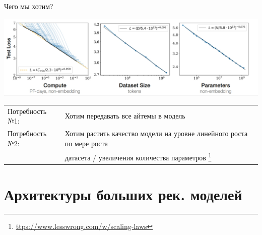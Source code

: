 \documentclass[11pt,aspectratio=169,handout]{beamer}
\begin{document}
\begin{frame}{Чего мы хотим?}
\begin{center}
\includegraphics[scale=0.25]{images/scaling_laws.png}
\end{center}

\vfill
\begin{small}
\begin{tabular}{l l}
Потребность №1: & Хотим передавать все айтемы в модель \\
Потребность №2: & Хотим растить качество модели на уровне линейного роста по мере роста \\
& датасета / увеличения количества параметров
\footnote{\url{ttps://www.lesswrong.com/w/scaling-laws}}
\end{tabular}
\end{small}

\end{frame}


\section{Архитектуры больших рек. моделей}
\end{document}

